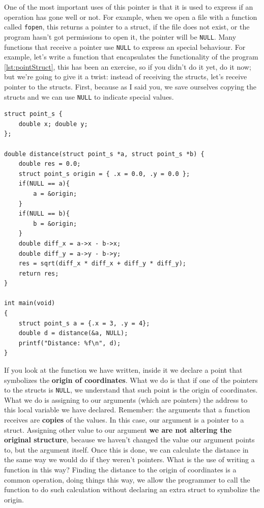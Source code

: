 \documentclass[a4paper]{article}
\begin{document}
One of the most important uses of this pointer is that it is used to express if
an operation has gone well or not. For example, when we open a file with a
function called \verb!fopen!, this returns a pointer to a struct, if the file
does not exist, or the program hasn't got permissions to open it, the pointer
will be \verb"NULL". Many functions that receive a pointer use \verb!NULL! to
express an special behaviour. For example, let's write a function that
encapsulates the functionality of the program \ref{lst:pointStruct}, this has
been an exercise, so if you didn't do it yet, do it now; but we're going to
give it a twist: instead of receiving the structs, let's receive pointer to the
structs. First, because as I said you, we save ourselves copying the structs and
we can use \verb!NULL! to indicate special values.

\noindent
\begin{minipage}[H]{\linewidth}
\mbox{}
\begin{lstlisting}[style=C, label={lst:nullPointers},
caption={Use of pointers to \texttt{NULL}}]
struct point_s {
    double x; double y;
};

double distance(struct point_s *a, struct point_s *b) {
    double res = 0.0;
    struct point_s origin = { .x = 0.0, .y = 0.0 };
    if(NULL == a){
        a = &origin;
    }
    if(NULL == b){
        b = &origin;
    }
    double diff_x = a->x - b->x;
    double diff_y = a->y - b->y;
    res = sqrt(diff_x * diff_x + diff_y * diff_y);
    return res;
}

int main(void)
{
    struct point_s a = {.x = 3, .y = 4};
    double d = distance(&a, NULL);
    printf("Distance: %f\n", d);
}
\end{lstlisting}
\end{minipage}

If you look at the function we have written, inside it we declare a point that
symbolizes the \textbf{origin of coordinates}. What we do is that if one of the
pointers to the structs is \verb!NULL!, we understand that such point is
the origin of coordinates. What we do is assigning to our arguments (which
are pointers) the address to this local variable we have declared. Remember:
the arguments that a function receives are \textbf{copies} of the values. In
this case, our argument is a pointer to a struct. Assigning other value
to our argument \textbf{we are not altering the original structure}, because we
haven't changed the value our argument points to, but the argument itself. Once
this is done, we can calculate the distance in the same way we would do if they
weren't pointers. What is the use of writing a function in this way? Finding
the distance to the origin of coordinates is a common operation, doing things
this way, we allow the programmer to call the function to do such calculation
without declaring an extra struct to symbolize the origin.
\end{document}
